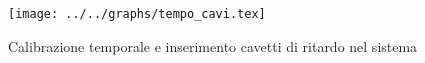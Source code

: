 \begin{figure}[h] \centering\texttt{[image: ../../graphs/tempo\_cavi.tex]}\caption{Calibrazione temporale e inserimento cavetti di ritardo nel sistema }\label{gr:tempo_cavi} \end{figure}
